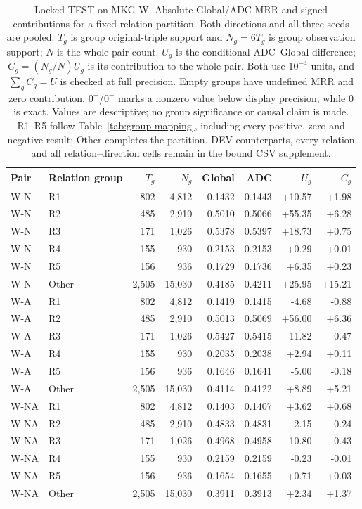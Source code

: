 \begin{table}[htbp]
\centering\footnotesize\setlength{\tabcolsep}{3pt}
\caption{Locked TEST on MKG-W. Absolute Global/ADC MRR and signed contributions for a fixed relation partition. Both directions and all three seeds are pooled: $T_g$ is group original-triple support and $N_g=6T_g$ is group observation support; $N$ is the whole-pair count. $U_g$ is the conditional ADC--Global difference; $C_g=(N_g/N)U_g$ is its contribution to the whole pair. Both use $10^{-4}$ units, and $\sum_g C_g=U$ is checked at full precision. Empty groups have undefined MRR and zero contribution. $0^{+}$/$0^{-}$ marks a nonzero value below display precision, while 0 is exact. Values are descriptive; no group significance or causal claim is made. R1--R5 follow Table~\ref{tab:group-mapping}, including every positive, zero and negative result; Other completes the partition. DEV counterparts, every relation and all relation--direction cells remain in the bound CSV supplement.}
\label{tab:group-named_mkg_w}
\begin{tabular}{llrrrrrr}
\toprule
Pair & Relation group & $T_g$ & $N_g$ & Global & ADC & $U_g$ & $C_g$\\
\midrule
W-N & R1 & 802 & 4,812 & 0.1432 & 0.1443 & +10.57 & +1.98\\
W-N & R2 & 485 & 2,910 & 0.5010 & 0.5066 & +55.35 & +6.28\\
W-N & R3 & 171 & 1,026 & 0.5378 & 0.5397 & +18.73 & +0.75\\
W-N & R4 & 155 & 930 & 0.2153 & 0.2153 & +0.29 & +0.01\\
W-N & R5 & 156 & 936 & 0.1729 & 0.1736 & +6.35 & +0.23\\
W-N & Other & 2,505 & 15,030 & 0.4185 & 0.4211 & +25.95 & +15.21\\
W-A & R1 & 802 & 4,812 & 0.1419 & 0.1415 & -4.68 & -0.88\\
W-A & R2 & 485 & 2,910 & 0.5013 & 0.5069 & +56.00 & +6.36\\
W-A & R3 & 171 & 1,026 & 0.5427 & 0.5415 & -11.82 & -0.47\\
W-A & R4 & 155 & 930 & 0.2035 & 0.2038 & +2.94 & +0.11\\
W-A & R5 & 156 & 936 & 0.1646 & 0.1641 & -5.00 & -0.18\\
W-A & Other & 2,505 & 15,030 & 0.4114 & 0.4122 & +8.89 & +5.21\\
W-NA & R1 & 802 & 4,812 & 0.1403 & 0.1407 & +3.62 & +0.68\\
W-NA & R2 & 485 & 2,910 & 0.4833 & 0.4831 & -2.15 & -0.24\\
W-NA & R3 & 171 & 1,026 & 0.4968 & 0.4958 & -10.80 & -0.43\\
W-NA & R4 & 155 & 930 & 0.2159 & 0.2159 & -0.23 & -0.01\\
W-NA & R5 & 156 & 936 & 0.1654 & 0.1655 & +0.71 & +0.03\\
W-NA & Other & 2,505 & 15,030 & 0.3911 & 0.3913 & +2.34 & +1.37\\
\bottomrule
\end{tabular}
\end{table}

